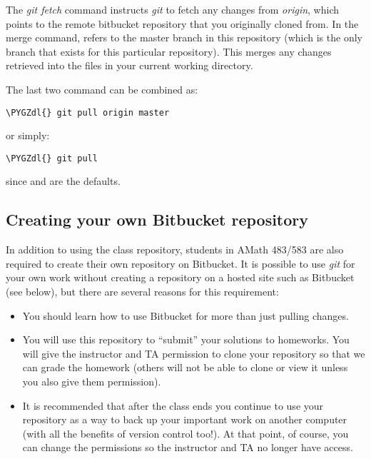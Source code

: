 \documentclass[letterpaper,10pt,english]{sphinxmanual}
\def\PYGZdl{\char`\$}
\begin{document}
The \emph{git fetch} command instructs \emph{git} to fetch any changes from \emph{origin},
which points to the remote bitbucket repository that you originally cloned
from.  In the merge command,  refers to the master branch
in this repository (which
is the only branch that exists for this particular repository).
This merges any changes retrieved into the files in your current working
directory.

The last two command can be combined as:

\begin{Verbatim}[commandchars=\\\{\}]
\PYGZdl{} git pull origin master
\end{Verbatim}

or simply:

\begin{Verbatim}[commandchars=\\\{\}]
\PYGZdl{} git pull
\end{Verbatim}

since  and  are the defaults.


\subsection{Creating your own Bitbucket repository}
\label{git:mygit}\label{git:creating-your-own-bitbucket-repository}
In addition to using the class repository, students in AMath 483/583 are
also required to create their own repository on Bitbucket.  It is possible
to use \emph{git} for your own work without creating a repository on a hosted
site such as Bitbucket (see  below), but there are several
reasons for this requirement:
\begin{itemize}
\item {} 
You should learn how to use Bitbucket for more than just pulling changes.

\item {} 
You will use this repository to ``submit'' your solutions to homeworks.
You will give the instructor and TA permission to clone your repository so
that we can grade the homework (others will not be able to clone or view it
unless you also give them permission).

\item {} 
It is recommended that after the class ends you
continue to use your repository as a way to back up your important work on
another computer (with all the benefits of version control too!).
At that point, of course, you can change the permissions so the
instructor and TA no longer have access.

\end{itemize}
\end{document}
